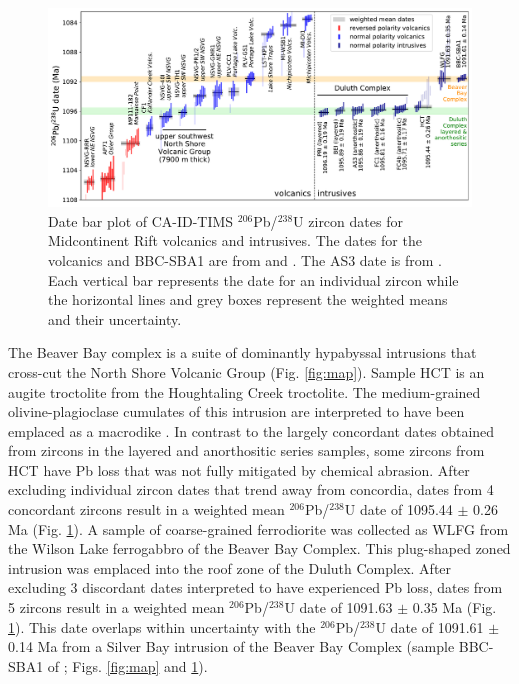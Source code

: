 \documentclass[11pt,letterpaper]{article}
\begin{document}
\begin{figure}[!ht]
\noindent\includegraphics[width=\textwidth]{./Figures/MCR_Dates.pdf}
\caption{\small{Date bar plot of CA-ID-TIMS $^{206}$Pb/$^{238}$U zircon dates for Midcontinent Rift volcanics and intrusives. The dates for the volcanics and BBC-SBA1 are from \cite{Fairchild2017a} and \cite{Swanson-Hysell2019a}. The AS3 date is from \cite{Schoene2006a}. Each vertical bar represents the date for an individual zircon while the horizontal lines and grey boxes represent the weighted means and their uncertainty.}}
\label{fig:dates}
\end{figure}

The Beaver Bay complex is a suite of dominantly hypabyssal intrusions that cross-cut the North Shore Volcanic Group (Fig. \ref{fig:map}). Sample HCT is an augite troctolite from the Houghtaling Creek troctolite. The medium-grained olivine-plagioclase cumulates of this intrusion are interpreted to have been emplaced as a macrodike \citep{Miller2001a}. In contrast to the largely concordant dates obtained from zircons in the layered and anorthositic series samples, some zircons from HCT have Pb loss that was not fully mitigated by chemical abrasion. After excluding individual zircon dates that trend away from concordia, dates from 4 concordant zircons result in a weighted mean $^{206}$Pb/$^{238}$U date of 1095.44 $\pm$ 0.26 Ma (Fig. \ref{fig:dates}). A sample of coarse-grained ferrodiorite was collected as WLFG from the Wilson Lake ferrogabbro of the Beaver Bay Complex. This plug-shaped zoned intrusion was emplaced into the roof zone of the Duluth Complex. After excluding 3 discordant dates interpreted to have experienced Pb loss, dates from 5 zircons result in a weighted mean $^{206}$Pb/$^{238}$U date of 1091.63 $\pm$ 0.35 Ma (Fig. \ref{fig:dates}). This date overlaps within uncertainty with the $^{206}$Pb/$^{238}$U date of 1091.61 $\pm$ 0.14 Ma from a Silver Bay intrusion of the Beaver Bay Complex (sample BBC-SBA1 of \citealp{Fairchild2017a}; Figs. \ref{fig:map} and \ref{fig:dates}).
\end{document}
